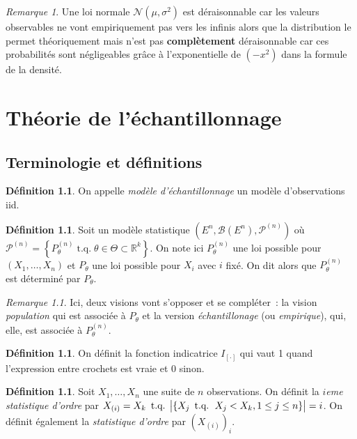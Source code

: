 \documentclass{report}
\DeclareMathOperator{\tq}{\text{ t.q. }}
\newcommand{\statmod}[4]{\left(#1^{#4}, #2\left(#1^{#4}\right), #3^{\left(#4\right)}\right)}
\newcommand{\Nms}{\mathcal N(\mu, \sigma^2)}
\newcommand{\R}{\mathbb R}
\newcommand{\Brl}{\mathcal B}  %
\theoremstyle{definition}
\newtheorem{déf}[thm]{Définition}
\theoremstyle{remark}
\newtheorem*{rmq}{Remarque}
\begin{document}
	\begin{rmq} Une loi normale $\Nms$ est déraisonnable car les valeurs observables ne vont empiriquement pas vers les infinis alors que la distribution le
	permet théoriquement mais n'est pas \textbf{complètement} déraisonnable car ces probabilités sont négligeables grâce à l'exponentielle de $(-x^2)$ dans la
	formule de la densité.
	\end{rmq}

\chapter{Théorie de l'échantillonnage}
	\section{Terminologie et définitions}
		\begin{déf} On appelle \textit{modèle d'échantillonnage} un modèle d'observations iid.  \end{déf}

		\begin{déf} Soit un modèle statistique $\statmod E\Brl{\mathcal P}n$ où $\mathcal P^{(n)} =
		\left\{P_\theta^{(n)} \tq \theta \in \Theta \subset \R^k\right\}$. On note ici $P^{(n)}_\theta$ une loi possible pour $(X_1, \ldots, X_n)$ et $P_\theta$
		une loi possible pour $X_i$ avec $i$ fixé. On dit alors que $P^{(n)}_\theta$ est déterminé par $P_\theta$.
		\end{déf}

		\begin{rmq} Ici, deux visions vont s'opposer et se compléter~: la vision \textit{population} qui est associée à $P_\theta$ et la version
		\textit{échantillonage} (ou \textit{empirique}), qui, elle, est associée à $P_\theta^{(n)}$.
		\end{rmq}

		\begin{déf} On définit la fonction indicatrice $I_{[\cdot]}$ qui vaut 1 quand l'expression entre crochets est vraie et 0 sinon. \end{déf}

		\begin{déf} Soit $X_1, \ldots, X_n$ une suite de $n$ observations. On définit la \textit{$i$eme statistique d'ordre} par
		$X_{(i)} = X_k \tq \abs {\{X_j \tq X_j < X_k, 1 \leq j \leq n\}} = i$. On définit également la \textit{statistique d'ordre} par $\left(X_{(i)}\right)_i$.
		\end{déf}
\end{document}
